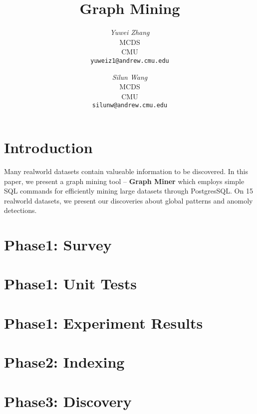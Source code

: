 \documentclass[12pt]{article}
\begin{document}
\newcommand{\beq}{\begin{equation}}
\newcommand{\eeq}{\end{equation}}
\newcommand{\bit}{\begin{itemize*}}
\newcommand{\eit}{\end{itemize*}}
\newcommand{\goal}[1]{ {\noindent {$\Rightarrow$} \em {#1} } }
\newcommand{\hide}[1]{}
\newcommand{\comment}[1]{ {\footnotesize {#1} } }
\newtheorem{lemma}{Lemma}
\newtheorem{theorem}{Theorem}
\newtheorem{proof}{Proof}
\newtheorem{defn}{Definition}
\newtheorem{algo}{Algorithm}
\newtheorem{observation}{Observation}

\setlength{\belowcaptionskip}{-20pt}
\setlength{\abovecaptionskip}{5pt}

\title{Graph Mining}


\author{ {\em Yuwei Zhang} \\
	    MCDS \\
	    CMU\\
	    {\tt yuweiz1@andrew.cmu.edu}
	 \and
	 {\em Silun Wang} \\
	     MCDS \\
	     CMU\\
	     {\tt silunw@andrew.cmu.edu}
}

\maketitle

\section{Introduction}
Many realworld datasets contain valueable information to be discovered. In this paper, we present a graph mining tool -- \textbf{Graph Miner} which employs simple SQL commands for efficiently mining large datasets through PostgresSQL. On 15 realworld datasets, we present our discoveries about global patterns and anomoly detections.

\section{Phase1: Survey}
    \label{sec:survey}
    


\section{Phase1: Unit Tests}
    \label{sec:experiments}
    

\section{Phase1: Experiment Results}
    \label{sec:conclusions}
    

\section{Phase2: Indexing}
    \label{sec:index}
    

\section{Phase3: Discovery}
    \label{sec:final}
    




\end{document}
